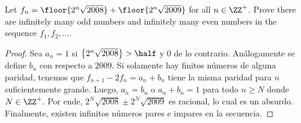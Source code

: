 \begin{probEG}[CGMO 2008/8]
	Let $f_n=\floor{2^n\sqrt{2008}}+\floor{2^n\sqrt{2009}}$ for all $n\in\ZZ^+$. Prove there are infinitely many odd numbers and infinitely many even numbers in the sequence $f_1,f_2,\dots$.
\end{probEG}

\begin{proof}
	Sea $a_n=1$ si $\left\{2^n\sqrt{2008}\right\}>\half$ y $0$ de lo contrario. Análogamente se define $b_n$ con respecto a $2009$. Si solamente hay finitos números de alguna paridad, tenemos que $f_{n+1}-2f_n=a_n+b_n$ tiene la misma paridad para $n$ suficientemente grande. Luego, $a_n=b_n$ o $a_n+b_n=1$ para todo $n\ge N$ donde $N\in\ZZ^+$. Por ende, $2^N\sqrt{2008}\pm2^N\sqrt{2009}$ es racional, lo cual es un absurdo. Finalmente, existen infinitos números pares e impares en la secuencia.
\end{proof}
